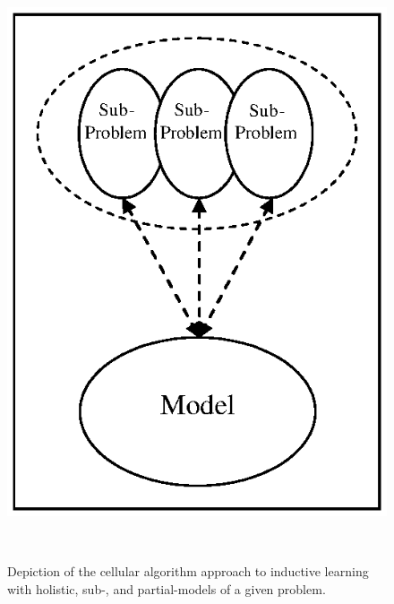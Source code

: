 \begin{figure}[htp]
{\begin{minipage}[t]{0.30\textwidth}
		\centering \includegraphics[scale=0.50]{IIDLE/mapping-cells-partialmodel}
	\end{minipage}}\\
	\caption{Depiction of the cellular algorithm approach to inductive learning with holistic, sub-, and partial-models of a given problem.}
	\label{fig:mapping:cells:models} %
\end{figure}

